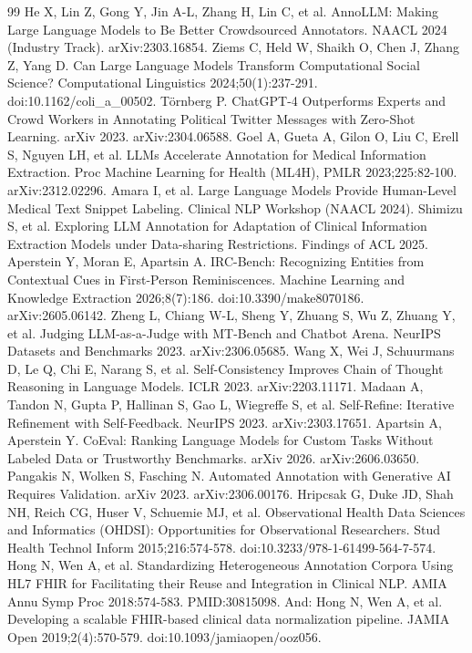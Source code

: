 \documentclass[3p,twocolumn]{elsarticle}
\begin{document}
\begin{thebibliography}{99}
\label{r25} He X, Lin Z, Gong Y, Jin A-L, Zhang H, Lin C, et al. AnnoLLM: Making Large Language Models to Be Better Crowdsourced Annotators. NAACL 2024 (Industry Track). arXiv:2303.16854.
\label{r26} Ziems C, Held W, Shaikh O, Chen J, Zhang Z, Yang D. Can Large Language Models Transform Computational Social Science? Computational Linguistics 2024;50(1):237-291. doi:10.1162/coli\_a\_00502.
\label{r27} Törnberg P. ChatGPT-4 Outperforms Experts and Crowd Workers in Annotating Political Twitter Messages with Zero-Shot Learning. arXiv 2023. arXiv:2304.06588.
\label{r28} Goel A, Gueta A, Gilon O, Liu C, Erell S, Nguyen LH, et al. LLMs Accelerate Annotation for Medical Information Extraction. Proc Machine Learning for Health (ML4H), PMLR 2023;225:82-100. arXiv:2312.02296.
\label{r29} Amara I, et al. Large Language Models Provide Human-Level Medical Text Snippet Labeling. Clinical NLP Workshop (NAACL 2024).
\label{r30} Shimizu S, et al. Exploring LLM Annotation for Adaptation of Clinical Information Extraction Models under Data-sharing Restrictions. Findings of ACL 2025.
\label{r31} Aperstein Y, Moran E, Apartsin A. IRC-Bench: Recognizing Entities from Contextual Cues in First-Person Reminiscences. Machine Learning and Knowledge Extraction 2026;8(7):186. doi:10.3390/make8070186. arXiv:2605.06142.
\label{r32} Zheng L, Chiang W-L, Sheng Y, Zhuang S, Wu Z, Zhuang Y, et al. Judging LLM-as-a-Judge with MT-Bench and Chatbot Arena. NeurIPS Datasets and Benchmarks 2023. arXiv:2306.05685.
\label{r33} Wang X, Wei J, Schuurmans D, Le Q, Chi E, Narang S, et al. Self-Consistency Improves Chain of Thought Reasoning in Language Models. ICLR 2023. arXiv:2203.11171.
\label{r34} Madaan A, Tandon N, Gupta P, Hallinan S, Gao L, Wiegreffe S, et al. Self-Refine: Iterative Refinement with Self-Feedback. NeurIPS 2023. arXiv:2303.17651.
\label{r35} Apartsin A, Aperstein Y. CoEval: Ranking Language Models for Custom Tasks Without Labeled Data or Trustworthy Benchmarks. arXiv 2026. arXiv:2606.03650.
\label{r36} Pangakis N, Wolken S, Fasching N. Automated Annotation with Generative AI Requires Validation. arXiv 2023. arXiv:2306.00176.
\label{r37} Hripcsak G, Duke JD, Shah NH, Reich CG, Huser V, Schuemie MJ, et al. Observational Health Data Sciences and Informatics (OHDSI): Opportunities for Observational Researchers. Stud Health Technol Inform 2015;216:574-578. doi:10.3233/978-1-61499-564-7-574.
\label{r38} Hong N, Wen A, et al. Standardizing Heterogeneous Annotation Corpora Using HL7 FHIR for Facilitating their Reuse and Integration in Clinical NLP. AMIA Annu Symp Proc 2018:574-583. PMID:30815098. And: Hong N, Wen A, et al. Developing a scalable FHIR-based clinical data normalization pipeline. JAMIA Open 2019;2(4):570-579. doi:10.1093/jamiaopen/ooz056.

\end{thebibliography}
\end{document}
